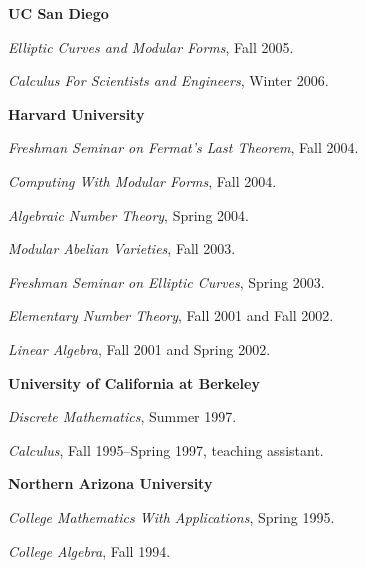 \documentclass[10pt]{article}
\newenvironment{bulletlist}
   {
      \begin{list}
         {$\cdot$}
         {
            \setlength{\itemsep}{.5ex}
            \setlength{\parsep}{0ex}
            \setlength{\leftmargin}{2.2em}
            \setlength{\parskip}{0ex}
            \setlength{\topsep}{0ex}
         }
   }
   {
      \end{list}
   }
\newcounter{totalnumclasses}
\newenvironment{classes}
   {
   \begin{revnumerate}[\value{totalnumclasses}]
   {}
         {
            \setlength{\itemsep}{.5ex}
            \setlength{\parsep}{0ex}
            \setlength{\leftmargin}{0em}
            \setlength{\parskip}{0ex}
            \setlength{\topsep}{0ex}
         }
   }
   {
\end{revnumerate}
   }
\newcommand{\marginlabel}[1]{
\begin{minipage}[b]{0.8\labelwidth}{\large \textsf{\textbf{#1}}}\end{minipage}}
\newcommand{\entrylabel}[1]{\mbox{\marginlabel{#1}}\hfill}
\newcommand{\MainListlabel}[1]
   {
      \parbox[t]{\labelwidth}{\hspace{.8em}\marginlabel{#1}}
   }
\newenvironment{MainList}[1]
   {
      \renewcommand{\entrylabel}{\MainListlabel}
      \begin{list}{}
      {
         \renewcommand{\makelabel}{\entrylabel}
         \setlength   {\itemindent}{-.65em}
         \setlength   {\labelwidth}{#1}
         \setlength   {\leftmargin}{\labelwidth}
         \setlength   {\itemsep}{3ex}
      }
   }
   {
      \end{list}
   }
\begin{document}
\begin{MainList}{88pt}
\setcounter{totalnumclasses}{13}
{\bf UC San Diego}
\begin{classes}
\item {\em Elliptic Curves and Modular Forms}, Fall 2005.
\item {\em Calculus For Scientists and Engineers}, Winter 2006.
\end{classes}

\setcounter{totalnumclasses}{11}
{\bf Harvard University}
\begin{classes}
\item {\em Freshman Seminar on Fermat's Last Theorem}, Fall 2004.
\item {\em Computing With Modular Forms}, Fall 2004.
\item {\em Algebraic Number Theory}, Spring 2004.
\item {\em Modular Abelian Varieties}, Fall 2003.
\item {\em Freshman Seminar on Elliptic Curves},  Spring 2003.
\item {\em Elementary Number Theory}, Fall 2001 and Fall 2002.
\item {\em Linear Algebra}, Fall 2001 and Spring 2002.
\end{classes}

\setcounter{totalnumclasses}{4}
{\bf University of California at Berkeley}
\begin{classes}
 \item {\em Discrete Mathematics}, Summer 1997.
 \item {\em Calculus}, Fall 1995--Spring 1997, teaching assistant.
\end{classes}

\setcounter{totalnumclasses}{2}
{\bf Northern Arizona University}
\begin{classes}
 \item {\em College Mathematics With Applications}, Spring 1995.
 \item {\em College Algebra}, Fall 1994.
\end{classes}









\end{MainList}
\end{document}

